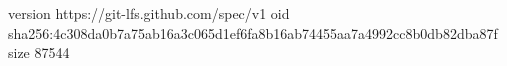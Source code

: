 version https://git-lfs.github.com/spec/v1
oid sha256:4c308da0b7a75ab16a3c065d1ef6fa8b16ab74455aa7a4992cc8b0db82dba87f
size 87544
